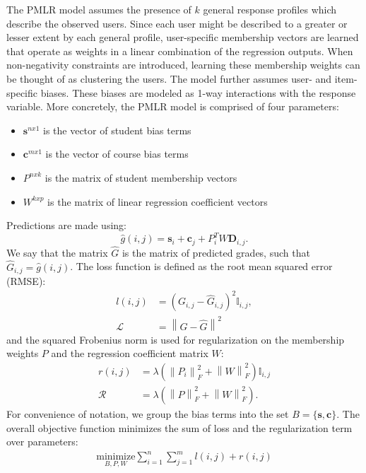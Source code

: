 \documentclass[10pt]{proc}
\newcommand{\norm}[1]{\left\lVert#1\right\rVert}
\begin{document}
The PMLR model assumes the presence of $k$ general response profiles which
describe the observed users. Since each user might be described to a greater or
lesser extent by each general profile, user-specific membership vectors are
learned that operate as weights in a linear combination of the regression
outputs. When non-negativity constraints are introduced, learning these
membership weights can be thought of as clustering the users. The model further
assumes user- and item-specific biases. These biases are modeled as 1-way
interactions with the response variable. More concretely, the PMLR model is
comprised of four parameters:
%
\begin{itemize}
    \item  $\bm{s}^{n x 1}$ is the vector of student bias terms
    \item  $\bm{c}^{m x 1}$ is the vector of course bias terms
    \item  $P^{n x k}$ is the matrix of student membership vectors
    \item  $W^{k x p}$ is the matrix of linear regression coefficient vectors
\end{itemize}
%
Predictions are made using:
%
\begin{equation}
    \hat{g}(i,j) = \bm{s}_i + \bm{c}_j + P_i^T W \bm{D}_{i,j}.
\end{equation}
%
We say that the matrix $\hat{G}$ is the matrix of predicted grades, such that
$\hat{G}_{i,j} = \hat{g}(i, j)$.
%
The loss function is defined as the root mean squared error (RMSE):
%
\begin{align}
    l(i,j) &= (G_{i,j} - \hat{G}_{i,j})^2 \mathbb{I}_{i,j},  \\
    \mathcal{L} &= \norm{G - \hat{G}}^2
\end{align}
%
and the squared Frobenius norm is used for regularization on the membership
weights $P$ and the regression coefficient matrix $W$:
%
\begin{align}
    r(i,j) &= \lambda (\norm{P_i}_F^2 + \norm{W}_F^2) \mathbb{I}_{i,j}  \\
    \mathcal{R} &= \lambda (\norm{P}_F^2 + \norm{W}_F^2).
\end{align}
%
For convenience of notation, we group the bias terms into the set $B = \{\bm{s},
\bm{c}\}$. The overall objective function minimizes the sum of loss and the
regularization term over parameters:
%
\begin{align}
    \underset{B, P, W}{\text{minimize}}
        \sum_{i=1}^n \sum_{j=1}^m l(i,j) + r(i,j)
\end{align}
\end{document}
